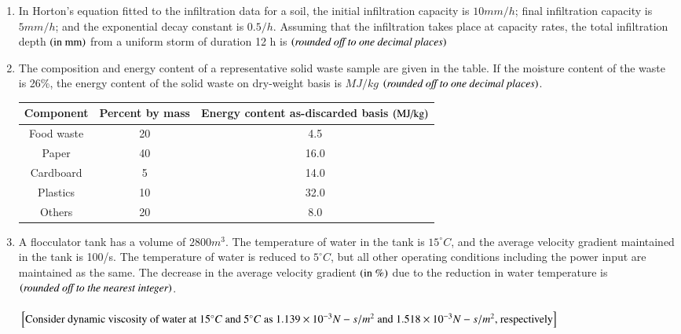 \documentclass[journal,14pt,onecolumn]{IEEEtran}
\theoremstyle{remark}
\begin{document}
\begin{enumerate}[label={Q\arabic*.}]
\item In Horton’s equation fitted to the infiltration data for a soil, the initial infiltration capacity is $10 mm/h$; final infiltration capacity is $5 mm/h$; and the exponential decay constant is $0.5 /h$. Assuming that the infiltration takes place at capacity rates, the total infiltration depth $\left(\text{in mm}\right)$ from a uniform storm of duration 12 h is \underline{\hspace{4cm}} $\left(\textit{rounded off to one decimal places}\right)$
\vspace{1cm}

\item The composition and energy content of a representative solid waste sample are given in the table. If the moisture content of the waste is 26\%, the energy content of the solid waste on dry-weight basis is \underline{\hspace{3cm}}$MJ/kg$ $\left(\textit{rounded off to one decimal places}\right)$.

\begin{table}[h!]
    \centering
    \begin{tabular}{|c|c|c|}
    \hline
    \textbf{Component} & \textbf{Percent by mass} & \textbf{Energy content as-discarded basis $\left(\text{MJ/kg}\right)$}\\
    \hline
    Food waste & 20 & 4.5\\
    \hline
    Paper & 40 & 16.0\\
    \hline
    Cardboard & 5 & 14.0\\
    \hline
    Plastics & 10 & 32.0\\
    \hline
    Others & 20 & 8.0\\
    \hline
    \end{tabular}
\end{table}
\vspace{1cm}

\item A flocculator tank has a volume of $2800 m^3$. The temperature of water in the tank is $15^\circ C$, and the average velocity gradient maintained in the tank is 100/s. The temperature of water is reduced to $5^\circ C$, but all other operating conditions including the power input are maintained as the same. The decrease in the average velocity gradient $\left(\text{in \%}\right)$ due to the reduction in water temperature is \underline{\hspace{2cm}} $\left(\textit{rounded off to the nearest integer}\right)$.\\
\\
${}\left[\text{Consider dynamic viscosity of water at $15^\circ C$ and $5^\circ C$ as $1.139\times10^{-3} N-s/m^2$ and $1.518\times10^{-3} N-s/m^2$, respectively}\right]$
\vspace{1cm}


\end{enumerate}
\end{document}
